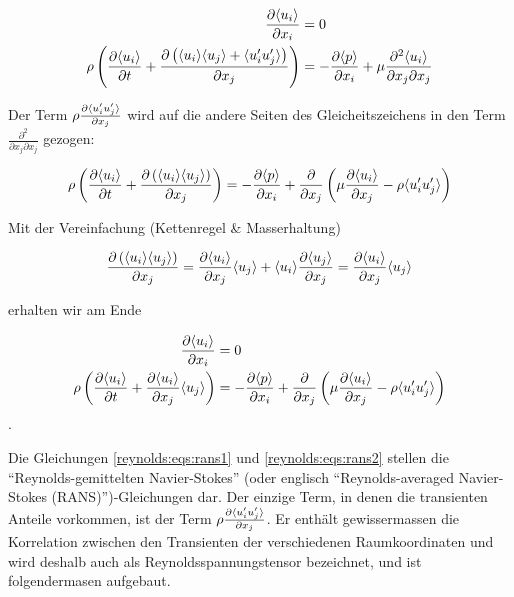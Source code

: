 \begin{align}
    \frac{\partial \langle u_i \rangle}{\partial x_i} &= 0 \\
    \rho \left(
            \frac{\partial \langle u_i \rangle}{\partial t} +
            \frac{\partial \left( \langle u_i \rangle \langle u_j \rangle + \langle u_i' u_j' \rangle\right)}{\partial x_j}
        \right) &=
        - \frac{\partial \langle p \rangle}{\partial x_i} + 
        \mu \frac{\partial^2 \langle u_i \rangle}{\partial x_j \partial x_j}
\end{align}

Der Term $\rho \frac{\partial \langle u_i' u_j' \rangle}{\partial x_j}$ wird auf die andere Seiten
des Gleicheitszeichens in den Term $\frac{\partial^2}{\partial x_j \partial x_j}$ gezogen:

\begin{equation}
    \rho \left(
            \frac{\partial \langle u_i \rangle}{\partial t} +
            \frac{\partial \left( \langle u_i \rangle \langle u_j \rangle\right)}{\partial x_j}
        \right) =
        - \frac{\partial \langle p \rangle}{\partial x_i} + 
            \frac{\partial}{\partial x_j} \left(
            \mu \frac{\partial \langle u_i \rangle}{\partial x_j} - \rho \langle u_i' u_j' \rangle
        \right)
\end{equation}

Mit der Vereinfachung (Kettenregel \& Masserhaltung)

\begin{equation}
    \frac{\partial \left( \langle u_i \rangle \langle u_j \rangle\right)}{\partial x_j} = \\
        \frac{\partial \langle u_i \rangle}{\partial x_j} \langle u_j \rangle +
        \langle u_i \rangle \frac{\partial \langle u_j \rangle}{\partial x_j} = \\
        \frac{\partial \langle u_i \rangle}{\partial x_j} \langle u_j \rangle
\end{equation}

erhalten wir am Ende

\begin{align}
    \label{reynolds:eqs:rans1}
    \frac{\partial \langle u_i \rangle}{\partial x_i} &= 0 \\
    \label{reynolds:eqs:rans2}
    \rho \left(
            \frac{\partial \langle u_i \rangle}{\partial t} +
            \frac{\partial \langle u_i \rangle}{\partial x_j} \langle u_j \rangle
        \right) &=
        - \frac{\partial \langle p \rangle}{\partial x_i} + 
            \frac{\partial}{\partial x_j} \left(
            \mu \frac{\partial \langle u_i \rangle}{\partial x_j} - \rho \langle u_i' u_j' \rangle
        \right)
\end{align}.

Die Gleichungen \ref{reynolds:eqs:rans1} und \ref{reynolds:eqs:rans2} stellen die
``Reynolds-gemittelten Navier-Stokes'' (oder englisch ``Reynolds-averaged
Navier-Stokes (RANS)'')-Gleichungen dar. Der einzige Term, in denen die transienten
Anteile vorkommen, ist der Term $\rho \frac{\partial \langle u_i' u_j' \rangle}{\partial x_j}$.
Er enthält gewissermassen die Korrelation zwischen den Transienten der verschiedenen Raumkoordinaten und wird deshalb auch als Reynoldsspannungstensor bezeichnet,
und ist folgendermasen aufgebaut.

